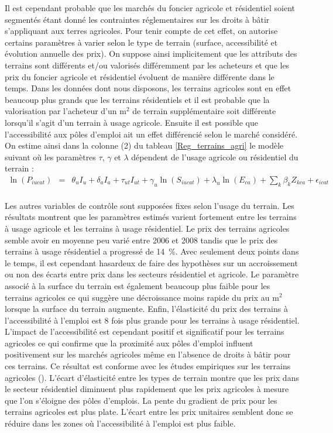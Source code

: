 \documentclass[10.5pt,a4paper]{article}
\begin{document}
{

Il est cependant probable que les marchés du foncier agricole et résidentiel soient segmentés étant donné les contraintes réglementaires sur les droits à bâtir s'appliquant aux terres agricoles. Pour tenir compte de cet effet, on autorise certains paramètres à varier selon le type de terrain (surface, accessibilité et évolution annuelle des prix). On suppose ainsi implicitement que les attributs des terrains sont différents et/ou valorisés différemment par les acheteurs et que les prix du foncier agricole et résidentiel évoluent de manière différente dans le temps. Dans les données dont nous disposons, les terrains agricoles sont en effet beaucoup plus grands que les terrains résidentiels et il est probable que la valorisation par l'acheteur d'un m$^2$ de terrain supplémentaire soit différente lorsqu'il s'agit d'un terrain à usage agricole. Ensuite il est possible que l'accessibilité aux pôles d'emploi ait un effet différencié selon le marché considéré. On estime ainsi dans la colonne (2) du tableau \ref{Reg_terrains_agri} le modèle suivant où les paramètres $\tau$, $\gamma$ et $\lambda$ dépendent de l'usage agricole ou résidentiel du terrain :
\begin{eqnarray*}
\ln(P_{iucat}) & =&  \theta_{u} I_u + \delta_{a} I_a + \tau_{ut} I_{ut}  +  \gamma_u \ln(S_{iucat}) + \lambda_u \ln(E_{ca}) +
\sum_k \beta_k Z_{kca}  + \epsilon_{icat} \\
\end{eqnarray*}

Les autres variables de contrôle sont supposées fixes selon l'usage du terrain. Les résultats montrent que les paramètres estimés varient fortement entre les terrains à usage agricole et les terrains à usage résidentiel. Le prix des terrains agricoles semble avoir en moyenne peu varié entre 2006 et 2008 tandis que le prix des terrains à usage résidentiel a progressé de 14~\%. Avec seulement deux points dans le temps, il est cependant hasardeux de faire des hypothèses sur un accroissement ou non des écarts entre prix dans les secteurs résidentiel et agricole. Le paramètre associé à la surface du terrain est également beaucoup plus faible pour les terrains agricoles ce qui suggère une décroissance moins rapide du prix au m$^2$ lorsque la surface du terrain augmente. Enfin, l'élasticité du prix des terrains à l'accessibilité à l'emploi est 8 fois plus grande pour les terrains à usage résidentiel. L'impact de l'accessibilité est cependant positif et significatif pour les terrains agricoles ce qui confirme que la proximité aux pôles d'emploi influent positivement sur les marchés agricoles même en l'absence de droits à bâtir pour ces terrains. Ce résultat est conforme avec les études empiriques sur les terrains agricoles (\cite{Cava03,Lecat04,LefeRouq11}). L'écart d'élasticité entre les types de terrain montre que les prix dans le secteur résidentiel diminuent plus rapidement que les prix agricoles à mesure que l'on s'éloigne des pôles d'emplois. La pente du gradient de prix pour les terrains agricoles est plus plate. L'écart entre les prix unitaires semblent donc se réduire dans les zones où l'accessibilité à l'emploi est plus faible. \par

}
\end{document}
